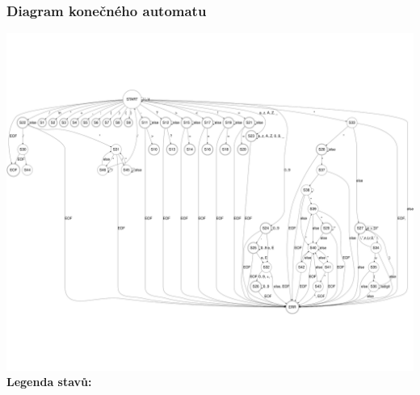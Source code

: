 \documentclass[12pt]{article}
\begin{document}
\subsubsection{Diagram konečného automatu}
\includegraphics{img/ifj-fsm.png}
\\
\textbf{Legenda stavů:}\\
\end{document}
